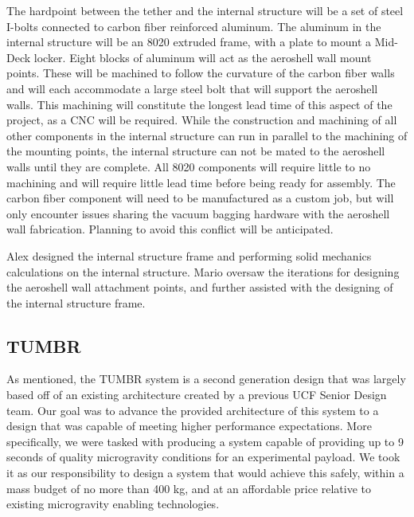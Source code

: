 \indent The hardpoint between the tether and the internal structure will be a set of steel I-bolts connected to carbon fiber reinforced aluminum. The aluminum in the internal structure will be an 8020 extruded frame, with a plate to mount a Mid-Deck locker. Eight blocks of aluminum will act as the aeroshell wall mount points. These will be machined to follow the curvature of the carbon fiber walls and will each accommodate a large steel bolt that will support the aeroshell walls. This machining will constitute the longest lead time of this aspect of the project, as a CNC will be required. While the construction and machining of all other components in the internal structure can run in parallel to the machining of the mounting points, the internal structure can not be mated to the aeroshell walls until they are complete. All 8020 components will require little to no machining and will require little lead time before being ready for assembly. The carbon fiber component will need to be manufactured as a custom job, but will only encounter issues sharing the vacuum bagging hardware with the aeroshell wall fabrication. Planning to avoid this conflict will be anticipated.

\indent Alex designed the internal structure frame and performing solid mechanics calculations on the internal structure. Mario oversaw the iterations for designing the aeroshell wall attachment points, and further assisted with the designing of the internal structure frame. 


\subsection{TUMBR}

\indent\indent As mentioned, the TUMBR system is a second generation design that was largely based off of an existing architecture created by a previous UCF Senior Design team. Our goal was to advance the provided architecture of this system to a design that was capable of meeting higher performance expectations. More specifically, we were tasked with producing a system capable of providing up to 9 seconds of quality microgravity conditions for an experimental payload. We took it as our responsibility to design a system that would achieve this safely, within a mass budget of no more than 400 kg, and at an affordable price relative to existing microgravity enabling technologies. 

